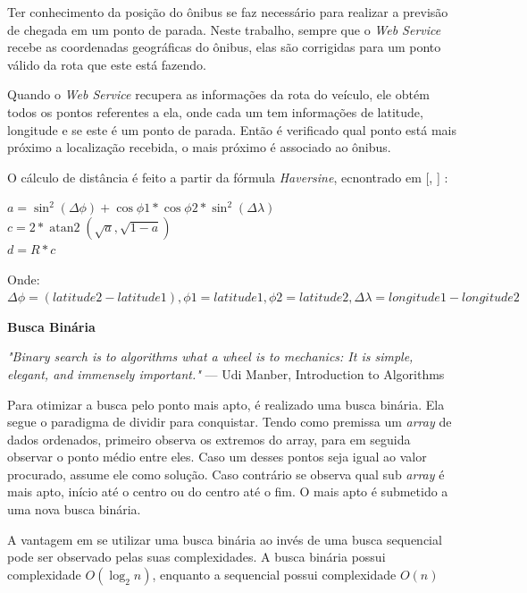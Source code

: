 \documentclass[
	12pt,				%
	oneside,			%
	a4paper,			%
	brazil				%
]{abntex2}
\DeclareMathOperator{\atantwo}{atan2}
\newcommand{\citecustom}[1]{[\citeauthoronline{#1}, \citeyear{#1}]}
\begin{document}
{Ter conhecimento da posição do ônibus se faz necessário para realizar a previsão de chegada em um ponto de parada. Neste trabalho, sempre que o \textit{Web Service} recebe as coordenadas geográficas do ônibus, elas são corrigidas para um ponto válido da rota que este está fazendo.

Quando o \textit{Web Service} recupera as informações da rota do veículo, ele obtém todos os pontos referentes a ela, onde cada um tem informações de latitude, longitude e se este é um ponto de parada. Então é verificado qual ponto está mais próximo a localização recebida, o mais próximo é associado ao ônibus.

O cálculo de distância é feito a partir da fórmula \textit{Haversine}, ecnontrado em \citecustom{movablescripts} :

\begin{center}

$ a = \sin^2(\Delta\phi) + \cos\phi1 * \cos\phi2 * \sin^2(\Delta\lambda) $  \\
$ c = 2 * \atantwo(\sqrt{a},\sqrt{1 - a}) $ \\
$ d = R * c $ 

\end{center}

Onde: $ \Delta\phi = (latitude2 - latitude1), \phi1 = latitude1, \phi2 = latitude2, \Delta\lambda = longitude1 - longitude2 $ 

\textbf{Busca Binária}

\begin{flushright}
\textit{"Binary search is to algorithms
what a wheel is to mechanics:
It is simple, elegant, and immensely important."}
— Udi Manber, Introduction to Algorithms
\end{flushright}

Para otimizar a busca pelo ponto mais apto, é realizado uma busca binária. Ela segue o paradigma de dividir para conquistar. Tendo como premissa um \textit{array} de dados ordenados, primeiro observa os extremos do array, para em seguida observar o ponto médio entre eles. Caso um desses pontos seja igual ao valor procurado, assume ele como solução. Caso contrário se observa qual sub \textit{array} é mais apto, início até o centro ou do centro até o fim. O mais apto é submetido a uma nova busca binária. 

A vantagem em se utilizar uma busca binária ao invés de uma busca sequencial pode ser observado pelas suas complexidades. A busca binária possui complexidade $O(\log_2 n)$, enquanto a sequencial possui complexidade $O(n)$

}
\end{document}
